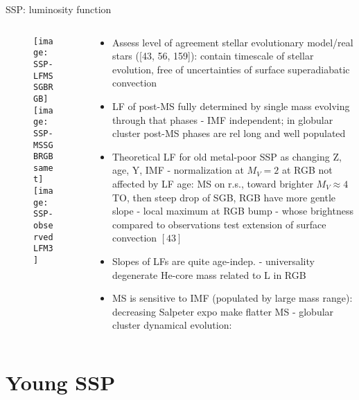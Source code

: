 \begin{frame}{SSP: luminosity function}
\begin{columns}[T]
	\begin{column}{0.40\textwidth}
		\begin{figure}[!ht]
			\texttt{[image: SSP-LFMSSGBRGB]}
			\texttt{[image: SSP-MSSGBRGBsamet]}
			\texttt{[image: SSP-observedLFM3]}
		\end{figure}
	\end{column}
	\begin{column}{0.45\textwidth}
		\begin{itemize}
			\item Assess level of agreement stellar evolutionary model/real stars ([43, 56, 159]): contain timescale of stellar evolution, free of uncertainties of surface superadiabatic convection
			\item LF of post-MS fully determined by single mass evolving through that phases - IMF independent; in globular cluster post-MS phases are rel long and well populated
			\item Theoretical LF for old metal-poor SSP as changing Z, age, Y, IMF - normalization at $M_V=2$ at RGB not affected by LF age: MS on r.s., toward brighter $M_V\approx4$ TO, then steep drop of SGB, RGB have more gentle slope - local maximum at RGB bump - whose brightness compared to observations test extension of surface convection $[43]$
			\item Slopes of LFs are quite age-indep. - universality \Pelectron degenerate He-core mass related to L in RGB
			\item MS is sensitive to IMF (populated by large mass range): decreasing Salpeter expo make flatter MS - globular cluster dynamical evolution: 
		\end{itemize}
	\end{column}
\end{columns}
\end{frame}

\section{Young SSP}

